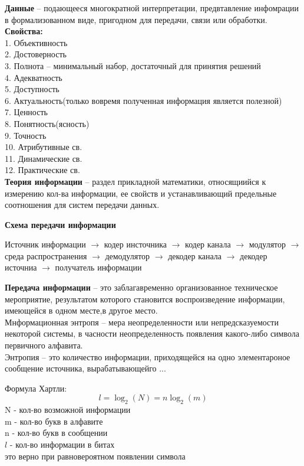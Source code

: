 \documentclass[a4paper, 12pt]{article}
\begin{document}
\textbf{Данные} -- подающееся многократной интерпретации, предвтавление инфомрации в формализованном виде, пригодном для передачи, связи или обработки.\\

\textbf{Свойства:}\\
1. Объективность\\
2. Достоверность\\
3. Полнота -- минимальный набор, достаточный для принятия решений\\
4. Адекватность \\
5. Доступность\\
6. Актуальность(только вовремя полученная информация является полезной)\\
7. Ценность\\
8. Понятность(ясность)\\
9. Точность\\
10. Атрибутивные св.\\
11. Динамические св.\\
12. Практические св.\\


\textbf{Теория информации} -- раздел прикладной математики, относящиийся к измерению кол-ва информации, ее свойств и устанавливающий предельные соотношения для систем передачи данных.\\
\begin{mdframed}[backgroundcolor=blue!20] 
       
  
\textbf{Схема передачи информации}

Источник информации $\to$ кодер инсточника $\to$ кодер канала $\to$ модулятор $\to$ среда распространения $\to$ демодулятор $\to$ декодер канала $\to$ декодер источниа $\to$ получатель информации
\end{mdframed}

\textbf{Передача информации} -- это заблагавременно организованное техническое мероприятие, результатом которого становится воспроизведение информации, имеющейся в одном месте,в другое место.\\

Мнформационная энтропя -- мера неопределенности или непредсказуемости некоторой системы, в часности неопределенность появления какого-либо символа первичного алфавита.\\
Энтропия -- это количество информации, приходящейся на одно элементароное сообщение источника, вырабатывающейго ...\\

\begin{mdframed}[backgroundcolor=blue!20] 
       Формула Хартли:\\
       \[l = \log_2 (N) = n \log_2 (m)\]
       N - кол-во возможной информации\\
       m - кол-во букв в алфавите\\
       n - кол-во букв в сообщении\\
       $ l $ - кол-во информации в битах\\
       это верно при равновероятном появлении символа\\
    \end{mdframed}
\end{document}
